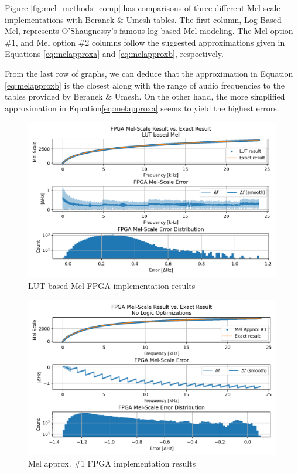 Figure \ref{fig:mel_methods_comp} has comparisons of three different 
Mel-scale implementations with Beranek \& Umesh tables.
The first column, Log Based Mel, represents
O'Shaugnessy's famous log-based Mel modeling.
The Mel option \#1, and Mel option \#2 columns 
follow the suggested approximations
given in Equations \ref{eq:melapproxa} 
and \ref{eq:melapproxb}, respectively.

From the last row of graphs, we can deduce that the approximation
in Equation \ref{eq:melapproxb} 
is the closest along with the range of audio frequencies
to the tables provided by Beranek \& Umesh.
On the other hand, the more simplified approximation 
in Equation\ref{eq:melapproxa} seems 
to yield the highest errors.

\begin{figure}[H]
    \centering
    \includegraphics[width=\linewidth]{Scaling/images/mel_lut}
    \caption{LUT based Mel FPGA implementation results}\label{fig:mel_lut}
\end{figure}

\begin{figure}[H]
    \centering
    \includegraphics[width=\linewidth]{Scaling/images/mel_approx_no_opt}
    \caption{Mel approx. \#1 FPGA implementation results}\label{fig:mel_approx_no_opt}
\end{figure}

